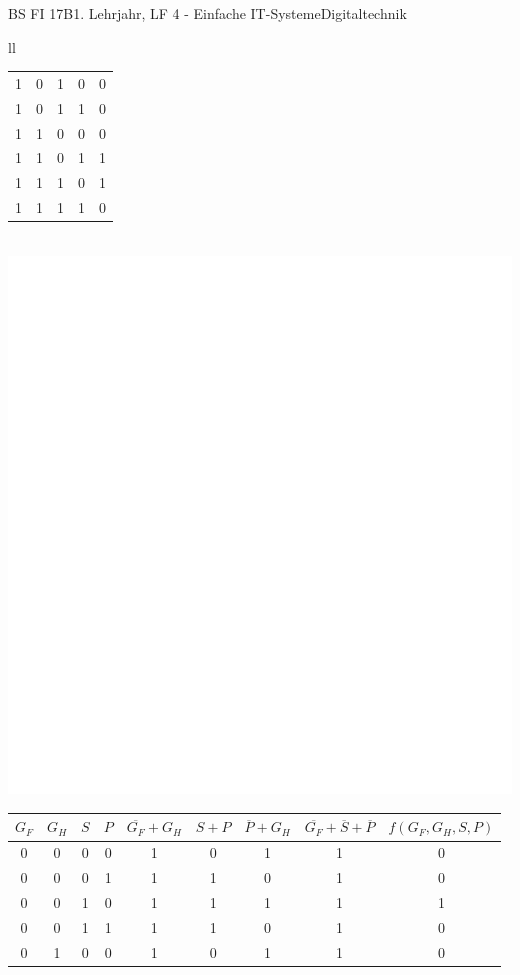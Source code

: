 \documentclass[oneside,openany,headings=optiontotoc,11pt,numbers=noenddot]{scrreprt}
\begin{document}
\begin{worksheet}{BS FI 17B}{1. Lehrjahr, LF 4 - Einfache IT-Systeme}{Digitaltechnik}
\begin{framed}
\begin{tabular}{ll}
\begin{tabularx}{0.45\textwidth}{c|c|c|c|c}
					1 & 0 & 1 & 0 & 0\\
					1 & 0 & 1 & 1 & 0\\
					1 & 1 & 0 & 0 & 0\\
					1 & 1 & 0 & 1 & 1\\
					1 & 1 & 1 & 0 & 1\\
					1 & 1 & 1 & 1 & 0
				\end{tabularx}
			\end{tabular}\\
			\includegraphics[scale=0.15]{../empty.jpg}\\
			\par\noindent
			\begin{tabularx}{0.95\textwidth}{c|c|c|c|c|c|c|c|c}
				\(G_F\) & \(G_H\) & \(S\) & \(P\) & \(\overline{G_F} + G_H\) & \(S + P\) & \(\overline{P} + G_H\) & \(\overline{G_F} + \overline{S} + \overline{P}\) & \(f(G_F,G_H,S,P)\)\\
				\hline
				0 & 0 & 0 & 0 & 1 & 0 & 1 & 1 & 0\\
				0 & 0 & 0 & 1 & 1 & 1 & 0 & 1 & 0\\
				0 & 0 & 1 & 0 & 1 & 1 & 1 & 1 & 1\\
				0 & 0 & 1 & 1 & 1 & 1 & 0 & 1 & 0\\
				0 & 1 & 0 & 0 & 1 & 0 & 1 & 1 & 0\\

\end{tabularx}
\end{framed}
\end{worksheet}
\end{document}
